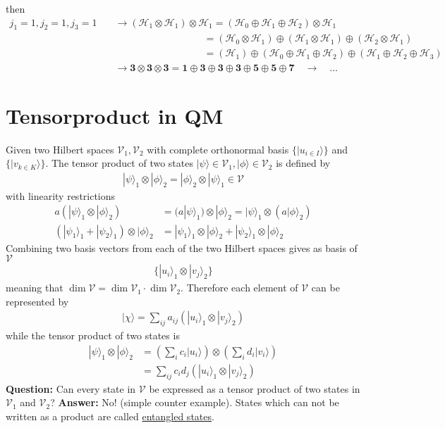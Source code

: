 \documentclass[../main.tex]{subfiles}
\begin{document}
then
\begin{align}
j_1=1, j_2=1, j_3=1\quad
&\rightarrow(\mathcal{H}_1\otimes\mathcal{H}_1)\otimes\mathcal{H}_1=(\mathcal{H}_0\oplus\mathcal{H}_1\oplus\mathcal{H}_2)\otimes\mathcal{H}_1\\
&\qquad\qquad\qquad\qquad\quad=(\mathcal{H}_0\otimes\mathcal{H}_1)\oplus(\mathcal{H}_1\otimes\mathcal{H}_1)\oplus(\mathcal{H}_2\otimes\mathcal{H}_1)\\
&\qquad\qquad\qquad\qquad\quad=(\mathcal{H}_1)\oplus(\mathcal{H}_0\oplus\mathcal{H}_1\oplus\mathcal{H}_2)\oplus(\mathcal{H}_1\oplus\mathcal{H}_2\oplus\mathcal{H}_3)\\
&\rightarrow\mathbf{3}\otimes\mathbf{3}\otimes\mathbf{3}=\mathbf{1}\oplus\mathbf{3}\oplus\mathbf{3}\oplus\mathbf{3}\oplus\mathbf{5}\oplus\mathbf{5}\oplus\mathbf{7}
\quad\rightarrow\quad  ...
\end{align}


\section{Tensorproduct in QM}
Given two Hilbert spaces $\mathcal{V}_1, \mathcal{V}_2$ with complete orthonormal basis $\{|u_{i\in I}\rangle\}$ and $\{|v_{k\in K}\rangle\}$. The tensor product of two states $|\psi\rangle\in\mathcal{V}_1, |\phi\rangle\in\mathcal{V}_2$
is defined by
\begin{align}
|\psi\rangle_1 \otimes |\phi\rangle_2= |\phi\rangle_2 \otimes |\psi\rangle_1\in \mathcal{V}
\end{align}
with linearity restrictions
\begin{align}
a(|\psi\rangle_1 \otimes |\phi\rangle_2)
&=(a|\psi\rangle_1) \otimes |\phi\rangle_2
=|\psi\rangle_1 \otimes (a|\phi\rangle_2)\\
(|\psi_1\rangle_1 + |\psi_2\rangle_1)\otimes|\phi\rangle_2
&=|\psi_1\rangle_1\otimes|\phi\rangle_2 + |\psi_2\rangle_1\otimes|\phi\rangle_2
\end{align}
Combining two basis vectors from each of the two Hilbert spaces gives as basis of $\mathcal{V}$
\begin{align}
\{|u_i\rangle_1\otimes|v_j\rangle_2\}
\end{align}
meaning that $\dim \mathcal{V}=\dim \mathcal{V}_1\cdot\dim \mathcal{V}_2$.
Therefore each element of $\mathcal{V}$ can be represented by
\begin{align}
|\chi\rangle=\sum_{ij}a_{ij}(|u_i\rangle_1\otimes|v_j\rangle_2)
\end{align}
while the tensor product of two states is
\begin{align}
|\psi\rangle_1 \otimes |\phi\rangle_2
&=\left(\sum_ic_i|u_i\rangle\right)\otimes\left(\sum_id_i|v_i\rangle\right)\\
&=\sum_{ij}c_id_j(|u_i\rangle_1\otimes|v_j\rangle_2)
\end{align}
{\bf Question:} Can every state in $\mathcal{V}$ be expressed as a tensor product of two states in $\mathcal{V}_1$ and $\mathcal{V}_2$? {\bf Answer:} No!  (simple counter example). States which can not be  written as a product are called \underline{entangled  states}.
\end{document}
